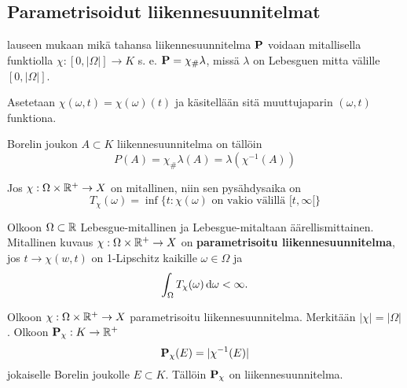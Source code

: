 \subsection{Parametrisoidut liikennesuunnitelmat}
 lauseen mukaan mikä tahansa liikennesuunnitelma $\P$ voidaan  mitallisella funktiolla $\chi: [0, |\Omega|] \to K$ s. e. $\P = \chi_\# \lambda$, missä $\lambda$ on Lebesguen mitta välille $[0, |\Omega|]$. 

Asetetaan $\chi(\omega, t) = \chi(\omega)(t)$ ja käsitellään sitä muuttujaparin $(\omega, t)$ funktiona.

Borelin joukon $A\subset K$ liikennesuunnitelma on tällöin 
$$ P(A) = \chi_\# \lambda (A) = \lambda(\chi^{-1}(A))$$

\begin{definition}
    Jos $\chi: \Omega \times \R^+ \to X$ on mitallinen, niin sen pysähdysaika on
    \[T_\chi (\omega) = \inf\{t : \chi(\omega) \text{ on vakio välillä } [t,\infty[\}\]
\end{definition}

\begin{definition}
    Olkoon $\Omega \subset \R$ Lebesgue-mitallinen ja Lebesgue-mitaltaan äärellismittainen. Mitallinen kuvaus $\chi: \Omega \times \R^+ \to X$ on \textbf{parametrisoitu liikennesuunnitelma}, jos $t\to \chi(w,t)$ on 1-Lipschitz kaikille $\omega \in \Omega$ ja
    \[\int_\Omega T_\chi (\omega) \, \d \omega < \infty .\]
\end{definition}

\begin{definition}
    Olkoon $\chi:\Omega \times \R^+ \to X$ parametrisoitu liikennesuunnitelma. Merkitään $|\chi| = |\Omega|$. Olkoon $\P_\chi : K \to \R^+$
    \[\P_\chi (E) = |\chi^{-1}(E)|  \] jokaiselle Borelin joukolle $E\subset K$. Tällöin $\P_\chi$ on liikennesuunnitelma.
\end{definition}


